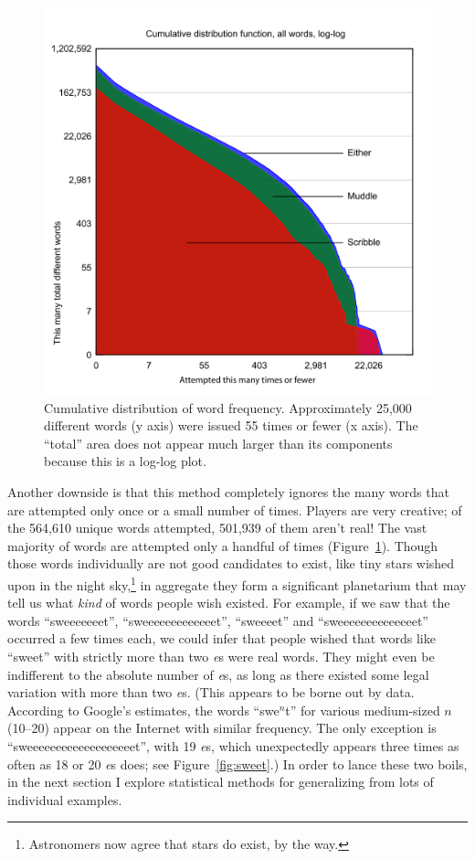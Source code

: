 \documentclass[twocolumn]{article}
\begin{document}
\begin{figure}
\includegraphics[width=\linewidth]{wishlist-cdf}
\vspace{-0.1in}\caption{Cumulative distribution of word frequency.
  Approximately 25,000 different words (y axis) were issued 55 times
  or fewer (x axis). The ``total'' area does not appear much larger
  than its components because this is a log-log plot.}
\label{fig:gamedistribution}
\end{figure}

Another downside is that this method completely ignores the many words
that are attempted only once or a small number of times. Players are
very creative; of the 564,610 unique words attempted, 501,939 of them
aren't real! The vast majority of words are attempted only a handful
of times (Figure~\ref{fig:gamedistribution}). Though those words
individually are not good candidates to exist, like tiny stars wished
upon in the night sky,\!\footnote{Astronomers now agree that stars do
  exist, by the way.} in aggregate they form a significant planetarium
that may tell us what {\it kind} of words people wish existed. For
example, if we saw that the words ``sweeeeeeet'',
``sweeeeeeeeeeeeet'', ``sweeeet'' and ``sweeeeeeeeeeeeeet'' occurred a
few times each, we could infer that people wished that words like
``sweet'' with strictly more than two {\it e}s were real words. They
might even be indifferent to the absolute number of {\it e}s, as long
as there existed some legal variation with more than two {\it e}s.
(This appears to be borne out by data. According to Google's
estimates, the words ``swe$^n$t'' for various medium-sized $n$
(10--20) appear on the Internet with similar frequency. The only
exception is ``sweeeeeeeeeeeeeeeeeeet'', with 19 {\it e}s, which
unexpectedly appears three times as often as 18 or 20 {\it e}s does;
see Figure~\ref{fig:sweet}.) In order to lance these two boils, in the
next section I explore statistical methods for generalizing from lots
of individual examples.
\end{document}
